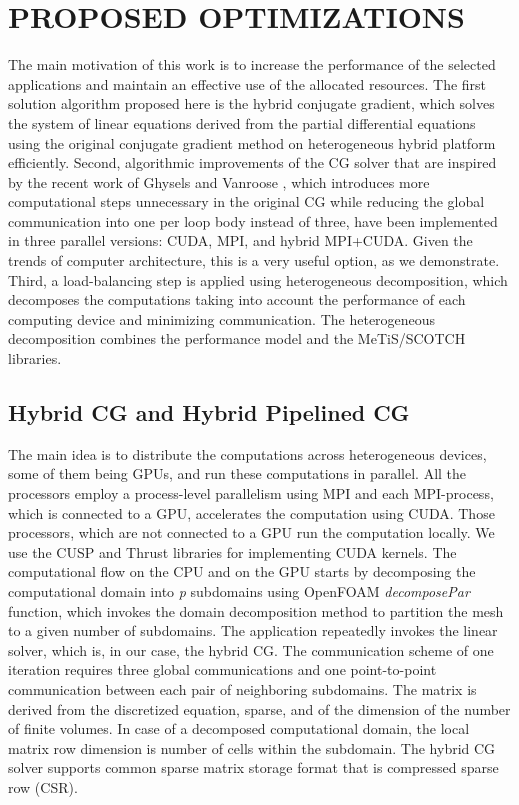 \documentclass[3p,times]{elsarticle}
\begin{document}
\section{PROPOSED OPTIMIZATIONS}
The main motivation of this work is to increase the performance of the selected applications and maintain an effective use of the allocated resources. The first solution algorithm proposed here is the hybrid conjugate gradient, which solves the system of linear equations derived from the partial differential equations using the original conjugate gradient method on heterogeneous hybrid platform efficiently. Second, algorithmic improvements of the CG solver that are inspired by the recent work of Ghysels and Vanroose \cite{pipecg}, which introduces more computational steps unnecessary in the original CG while reducing the global communication into one per loop body instead of three, have been implemented in three parallel versions: CUDA, MPI, and hybrid MPI+CUDA. Given the trends of computer architecture, this is a very useful option, as we demonstrate. Third, a load-balancing step is applied using heterogeneous decomposition, which decomposes the computations taking into account the performance of each computing device and minimizing communication. The heterogeneous decomposition combines the performance model and the MeTiS/SCOTCH libraries. \\

\subsection{Hybrid CG and Hybrid Pipelined CG}
The main idea is to distribute the computations across heterogeneous devices, some of them being GPUs, and run these computations in parallel. All the processors employ a process-level parallelism using MPI and each MPI-process, which is connected to a GPU, accelerates the computation using CUDA. Those processors, which are not connected to a GPU run the computation locally. We use the CUSP \cite{cusp} and Thrust \cite{thrust} libraries for implementing CUDA kernels. The computational flow on the CPU and on the GPU starts by decomposing the computational domain into \emph{p} subdomains using OpenFOAM \emph{decomposePar} function, which invokes the domain decomposition method to partition the mesh to a given number of subdomains. The application repeatedly invokes the linear solver, which is, in our case, the hybrid CG. The communication scheme of one iteration requires three global communications and one point-to-point communication between each pair of neighboring subdomains. The matrix is derived from the discretized equation, sparse, and of the dimension of the number of finite volumes. In case of a decomposed computational domain, the local matrix row dimension is number of cells within the subdomain. The hybrid CG solver supports common sparse matrix storage format that is compressed sparse row (CSR). \\
\end{document}
